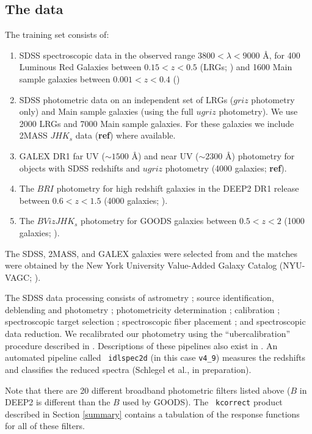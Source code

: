 \documentclass[10pt,preprint]{aastex}
\begin{document}
\subsection{The data}

The training set consists of:
\begin{enumerate}
\item SDSS spectroscopic data in the observed range $3800 < \lambda <
9000$ \AA, for 400 Luminous Red Galaxies between $0.15 < z < 0.5$ (LRGs;
\citealt{eisenstein01a}) and 1600 Main sample galaxies between $0.001
< z < 0.4$ (\citealt{strauss02a})
\item SDSS photometric data on an independent set of LRGs ($griz$
photometry only) and Main sample galaxies (using the full $ugriz$
photometry). We use 2000 LRGs and 7000 Main sample galaxies.  For
these galaxies we include 2MASS $JHK_s$ data ({\bf ref}) where
available.
\item GALEX DR1 far UV ($\sim 1500$ \AA) and near UV ($\sim 2300$ \AA)
photometry for objects with SDSS redshifts and $ugriz$ photometry (4000
galaxies; {\bf ref}).
\item The $BRI$ photometry for high redshift galaxies in the DEEP2 
DR1 release between $0.6 < z < 1.5$ (4000
galaxies; \citealt{davis03a, faber03a}).
\item The $BVizJHK_s$ photometry for GOODS galaxies between $0.5 < z < 2$ (1000
galaxies; \citealt{giavalisco04a}).
\end{enumerate}
The SDSS, 2MASS, and GALEX galaxies were selected from and the matches
were obtained by the New York University Value-Added Galaxy Catalog
(NYU-VAGC;
\citealt{blanton05a}).  

The SDSS data processing consists of astrometry \citep{pier03a};
source identification, deblending and photometry \citep{lupton01a};
photometricity determination \citep{hogg01a}; calibration
\citep{fukugita96a,smith02a}; spectroscopic target selection
\citep{eisenstein01a,strauss02a,richards02a}; spectroscopic fiber
placement \citep{blanton03a}; and spectroscopic data reduction.  We
recalibrated our photometry using the ``ubercalibration'' procedure
described in \citet{blanton05a}.  Descriptions of these pipelines also
exist in \citet{stoughton02a}.  An automated pipeline called {\tt
idlspec2d} (in this case {\tt v4\_9}) measures the redshifts and
classifies the reduced spectra (Schlegel et al., in preparation).

Note that there are 20 different broadband photometric filters listed
above ($B$ in DEEP2 is different than the $B$ used by GOODS). The {\tt
kcorrect} product described in Section \ref{summary} contains a
tabulation of the response functions for all of these filters.
\end{document}
